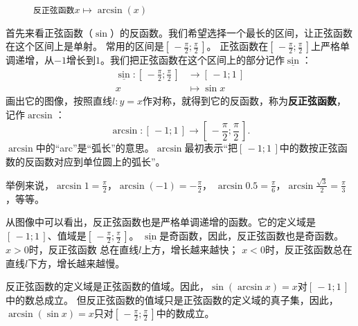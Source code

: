 \documentclass[12pt,UTF8,fontset=none]{ctexbook}
\begin{document}
\begin{figure}[h]
    \caption*{\texttt{反正弦函数}$x\mapsto \arcsin(x)$}
\end{figure}

首先来看正弦函数（$\sin$）的反函数。我们希望选择一个最长的区间，让正弦函数在这个区间上是单射。
常用的区间是$[\,-\frac{\pi}{2}; \frac{\pi}{2}\,]$。
正弦函数在$[\,-\frac{\pi}{2}; \frac{\pi}{2}\,]$上严格单调递增，从$-1$增长到$1$。我们把正弦函数在这个区间上的部分记作$\underline{\sin}$：
\begin{align*}
     \underline{\sin} : [\,-\frac{\pi}{2}; \frac{\pi}{2}\,] &\rightarrow [\,-1; 1\,] \\
                                                           x &\mapsto \sin{x} 
\end{align*}
画出它的图像，按照直线$l: y = x$作对称，就得到它的反函数，称为\textbf{反正弦函数}，记作$\arcsin$：
$$ \arcsin : [\,-1; 1\,] \rightarrow [\,-\frac{\pi}{2}; \frac{\pi}{2}\,] . $$
$\arcsin$中的“arc”是“弧长”的意思。$\arcsin$最初表示“把$[\,-1; 1\,]$中的数按正弦函数的反函数对应到单位圆上的弧长”。

举例来说，$\arcsin{1} = \frac{\pi}{2}$，$\arcsin{(-1)} = -\frac{\pi}{2}$，
$\arcsin{0.5} = \frac{\pi}{6}$，$\arcsin{\frac{\sqrt{3}}{2}} = \frac{\pi}{3}$，等等。

从图像中可以看出，反正弦函数也是严格单调递增的函数。它的定义域是$[\,-1; 1\,]$、值域是$\left[\,-\frac{\pi}{2}; \frac{\pi}{2}\,\right]$。
$\underline{\sin}$是奇函数，因此，反正弦函数也是奇函数。$x > 0$时，反正弦函数
总在直线$l$上方，增长越来越快；
$x < 0$时，反正弦函数总在直线$l$下方，增长越来越慢。

反正弦函数的定义域是正弦函数的值域。因此，$\sin{(\arcsin{x})} = x$对$[\,-1; 1\,]$中的数总成立。
但反正弦函数的值域只是正弦函数的定义域的真子集，因此，$\arcsin{(\sin{x})} = x$只对$\left[\,-\frac{\pi}{2}; \frac{\pi}{2}\,\right]$中的数成立。
\end{document}
